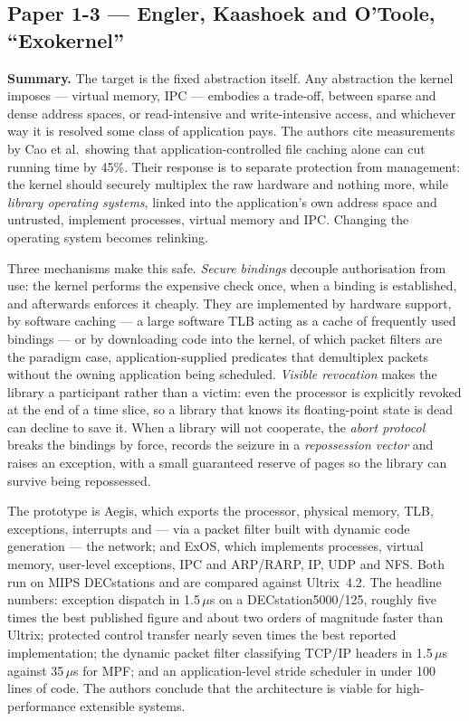 \subsection*{Paper 1-3 --- Engler, Kaashoek and O'Toole, ``Exokernel''}
\label{p3:sec:exokernel}

\textbf{Summary.}
The target is the fixed abstraction itself. Any abstraction the kernel imposes --- virtual
memory, IPC --- embodies a trade-off, between sparse and dense address spaces, or
read-intensive and write-intensive access, and whichever way it is resolved some class of
application pays. The authors cite measurements by Cao et al.\ showing that
application-controlled file caching alone can cut running time by 45\%. Their response is to
separate protection from management: the kernel should securely multiplex the raw hardware
and nothing more, while \emph{library operating systems}, linked into the application's own
address space and untrusted, implement processes, virtual memory and IPC. Changing the
operating system becomes relinking.

Three mechanisms make this safe. \emph{Secure bindings} decouple authorisation from use: the
kernel performs the expensive check once, when a binding is established, and afterwards
enforces it cheaply. They are implemented by hardware support, by software caching --- a
large software TLB acting as a cache of frequently used bindings --- or by downloading code
into the kernel, of which packet filters are the paradigm case, application-supplied
predicates that demultiplex packets without the owning application being scheduled.
\emph{Visible revocation} makes the library a participant rather than a victim: even the
processor is explicitly revoked at the end of a time slice, so a library that knows its
floating-point state is dead can decline to save it. When a library will not cooperate, the
\emph{abort protocol} breaks the bindings by force, records the seizure in a
\emph{repossession vector} and raises an exception, with a small guaranteed reserve of pages
so the library can survive being repossessed.

The prototype is Aegis, which exports the processor, physical memory, TLB, exceptions,
interrupts and --- via a packet filter built with dynamic code generation --- the network;
and ExOS, which implements processes, virtual memory, user-level exceptions, IPC and
ARP/RARP, IP, UDP and NFS. Both run on MIPS DECstations and are compared against Ultrix~4.2.
The headline numbers: exception dispatch in 1.5\,$\mu$s on a DECstation5000/125, roughly five
times the best published figure and about two orders of magnitude faster than Ultrix;
protected control transfer nearly seven times the best reported implementation; the dynamic
packet filter classifying TCP/IP headers in 1.5\,$\mu$s against 35\,$\mu$s for MPF; and an
application-level stride scheduler in under 100 lines of code. The authors conclude that the
architecture is viable for high-performance extensible systems.

